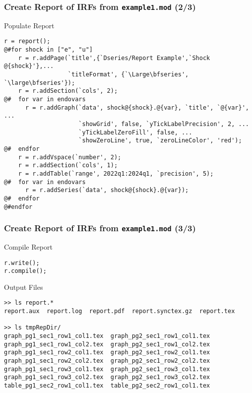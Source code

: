 \documentclass[10pt]{beamer}
\begin{document}
\begin{frame}[fragile=singleslide,t]
  \frametitle{Create Report of IRFs from \texttt{example1.mod} (2/3)}
  \begin{block}{Populate Report}
\small{
\begin{verbatim}
r = report();
@#for shock in ["e", "u"]
    r = r.addPage(`title',{`Dseries/Report Example',`Shock @{shock}'},...
                  `titleFormat', {`\Large\bfseries', `\large\bfseries'});
    r = r.addSection(`cols', 2);
@#  for var in endovars
      r = r.addGraph(`data', shock@{shock}.@{var}, `title', `@{var}', ...
                     `showGrid', false, `yTickLabelPrecision', 2, ...
                     `yTickLabelZeroFill', false, ...
                     `showZeroLine', true, `zeroLineColor', 'red');
@#  endfor
    r = r.addVspace(`number', 2);
    r = r.addSection(`cols', 1);
    r = r.addTable(`range', 2022q1:2024q1, `precision', 5);
@#  for var in endovars
      r = r.addSeries(`data', shock@{shock}.@{var});
@#  endfor
@#endfor
\end{verbatim}
}
  \end{block}
\end{frame}


\begin{frame}[fragile=singleslide,t]
  \frametitle{Create Report of IRFs from \texttt{example1.mod} (3/3)}
  \begin{block}{Compile Report}
\small{
\begin{verbatim}
r.write();
r.compile();
\end{verbatim}
}
  \end{block}
  \begin{block}{Output Files}
\small{
\begin{verbatim}
>> ls report.*
report.aux  report.log  report.pdf  report.synctex.gz  report.tex

>> ls tmpRepDir/
graph_pg1_sec1_row1_col1.tex  graph_pg2_sec1_row1_col1.tex
graph_pg1_sec1_row1_col2.tex  graph_pg2_sec1_row1_col2.tex
graph_pg1_sec1_row2_col1.tex  graph_pg2_sec1_row2_col1.tex
graph_pg1_sec1_row2_col2.tex  graph_pg2_sec1_row2_col2.tex
graph_pg1_sec1_row3_col1.tex  graph_pg2_sec1_row3_col1.tex
graph_pg1_sec1_row3_col2.tex  graph_pg2_sec1_row3_col2.tex
table_pg1_sec2_row1_col1.tex  table_pg2_sec2_row1_col1.tex
\end{verbatim}
}
  \end{block}
\end{frame}
\end{document}
